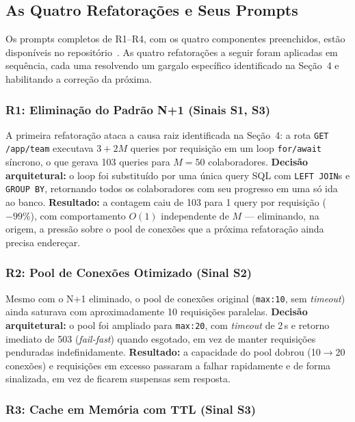 \documentclass[sigconf]{acmart}
\begin{document}
\subsection{As Quatro Refatorações e Seus Prompts}

Os prompts completos de R1–R4, com os quatro componentes preenchidos, estão disponíveis no repositório~\cite{GenAIDebt2026}. As quatro refatorações a seguir foram aplicadas em sequência, cada uma resolvendo um gargalo específico identificado na Seção~4 e habilitando a correção da próxima.

\subsubsection{R1: Eliminação do Padrão N+1 (Sinais S1, S3)}

A primeira refatoração ataca a causa raiz identificada na Seção~4: a rota \texttt{GET /app/team} executava $3+2M$ queries por requisição em um loop \texttt{for/await} síncrono, o que gerava 103 queries para $M=50$ colaboradores. \textbf{Decisão arquitetural:} o loop foi substituído por uma única query SQL com \texttt{LEFT JOIN}s e \texttt{GROUP BY}, retornando todos os colaboradores com seu progresso em uma só ida ao banco. \textbf{Resultado:} a contagem caiu de 103 para 1 query por requisição ($-99\%$), com comportamento $O(1)$ independente de $M$ — eliminando, na origem, a pressão sobre o pool de conexões que a próxima refatoração ainda precisa endereçar.

\subsubsection{R2: Pool de Conexões Otimizado (Sinal S2)}

Mesmo com o N+1 eliminado, o pool de conexões original (\texttt{max:10}, sem \textit{timeout}) ainda saturava com aproximadamente 10 requisições paralelas. \textbf{Decisão arquitetural:} o pool foi ampliado para \texttt{max:20}, com \textit{timeout} de 2\,s e retorno imediato de 503 (\textit{fail-fast}) quando esgotado, em vez de manter requisições penduradas indefinidamente. \textbf{Resultado:} a capacidade do pool dobrou (10$\rightarrow$20 conexões) e requisições em excesso passaram a falhar rapidamente e de forma sinalizada, em vez de ficarem suspensas sem resposta.

\subsubsection{R3: Cache em Memória com TTL (Sinal S3)}
\end{document}
